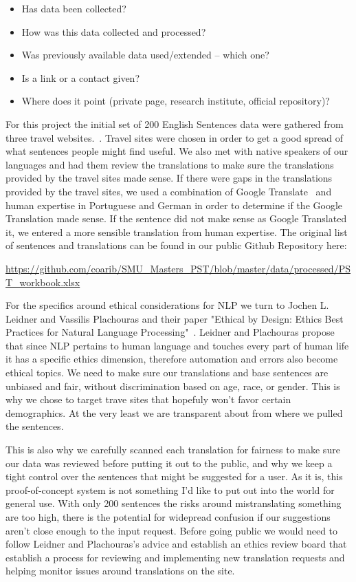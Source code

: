 \documentclass[runningheads]{llncs}
\begin{document}
\begin{itemize}
	\item Has data been collected? 
	\item How was this data collected and processed? 
 	\item Was previously available data used/extended – which one? 
	\item Is a link or a contact given? 
	\item Where does it point (private page, research institute, official repository)?
\end{itemize}

For this project the initial set of 200 English Sentences data were gathered from three travel websites.~\cite{ref_url11,ref_url12,ref_url13}. Travel sites were chosen in order to get a good spread of what sentences people might find useful. We also met with native speakers of our languages and had them review the translations to make sure the translations provided by the travel sites made sense. If there were gaps in the translations provided by the travel sites, we used a combination of Google Translate~\cite{ref_url14} and human expertise in Portuguese and German in order to determine if the Google Translation made sense. If the sentence did not make sense as Google Translated it, we entered a more sensible translation from human expertise. The original list of sentences and translations can be found in our public Github Repository here:

\url{https://github.com/coarib/SMU_Masters_PST/blob/master/data/processed/PST_workbook.xlsx}

For the specifics around ethical considerations for NLP we turn to Jochen L. Leidner and Vassilis Plachouras and their paper "Ethical by Design: Ethics Best Practices for Natural Language Processing"~\cite{ref_url15}.  Leidner and Plachouras propose that since NLP pertains to human language and touches every part of human life it has a specific ethics dimension, therefore automation and errors also become ethical topics. We need to make sure our translations and base sentences are unbiased and fair, without discrimination based on age, race, or gender. This is why we chose to target trave sites that hopefuly won't favor certain demographics. At the very least we are transparent about from where we pulled the sentences.

This is also why we carefully scanned each translation for fairness to make sure our data was reviewed before putting it out to the public, and why we keep a tight control over the sentences that might be suggested for a user. As it is, this proof-of-concept system is not something I'd like to put out into the world for general use. With only 200 sentences the risks around mistranslating something are too high, there is the potential for widepread confusion if our suggestions aren't close enough to the input request. Before going public we would need to follow Leidner and Plachouras's advice and establish an ethics review board that establish a process for reviewing and implementing new translation requests and helping monitor issues around translations on the site.
\end{document}
